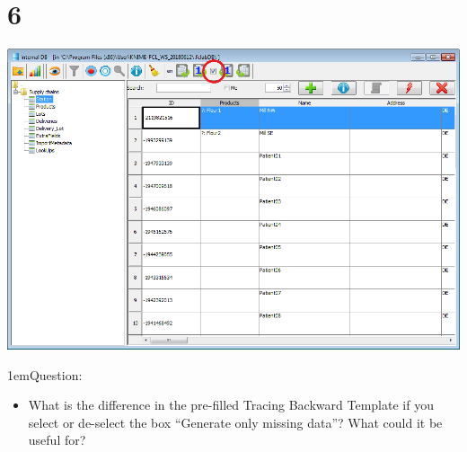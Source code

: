 \documentclass[10pt]{beamer}
\begin{document}
\section{6}
\begin{frame}
	\begin{center}
			\includegraphics[height=0.6\textheight]{6.png}
	\end{center}
\leftskip1em{Question:}
	\begin{itemize}
		\item What is the difference in the pre-filled Tracing Backward Template if you select or de-select the box ``Generate only missing data''? What could it be useful for?
	\end{itemize}
\end{frame}
\end{document}
